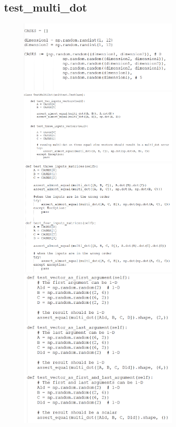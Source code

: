 \documentclass[a4paper,11pt]{article}
\begin{document}

\subsection{test\_multi\_dot}	
\begin{figure}[H]
	\centering
	\includegraphics[width=0.70\textwidth]{snippets/multi_dot/1CASES.png}
	\includegraphics[width=0.70\textwidth]{snippets/multi_dot/2.png}
	\includegraphics[width=0.70\textwidth]{snippets/multi_dot/3.png}
	\includegraphics[width=0.70\textwidth]{snippets/multi_dot/4.png}

\end{figure}
\end{document}
